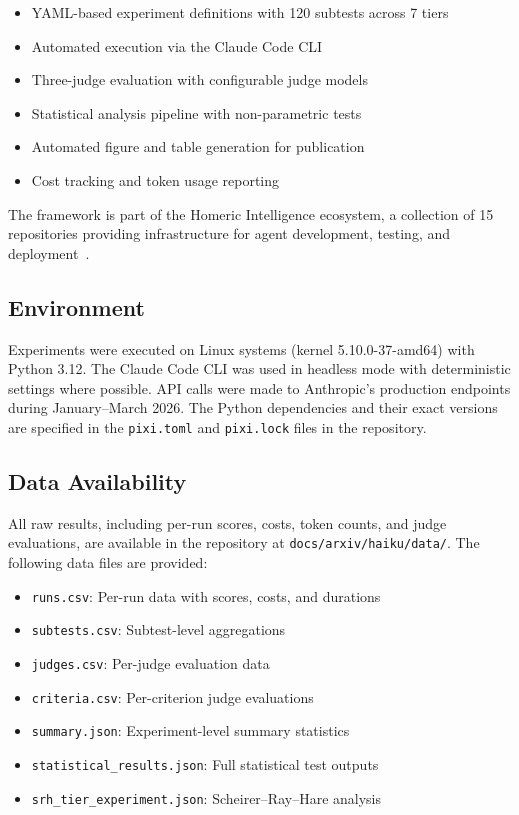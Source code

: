 \documentclass[11pt]{article}
\begin{document}
\begin{itemize}
  \item YAML-based experiment definitions with 120 subtests across 7 tiers
  \item Automated execution via the Claude Code CLI~\cite{anthropic2024claude}
  \item Three-judge evaluation with configurable judge models
  \item Statistical analysis pipeline with non-parametric tests
  \item Automated figure and table generation for publication
  \item Cost tracking and token usage reporting
\end{itemize}

The framework is part of the Homeric Intelligence ecosystem, a collection of
15 repositories providing infrastructure for agent development, testing, and
deployment~\cite{projectodyssey}.

\subsection{Environment}

Experiments were executed on Linux systems (kernel 5.10.0-37-amd64) with
Python 3.12. The Claude Code CLI was used in headless mode with deterministic
settings where possible. API calls were made to Anthropic's production
endpoints during January--March 2026. The Python dependencies and their
exact versions are specified in the \texttt{pixi.toml} and
\texttt{pixi.lock} files in the repository.

\subsection{Data Availability}

All raw results, including per-run scores, costs, token counts, and judge
evaluations, are available in the repository at
\texttt{docs/arxiv/haiku/data/}. The following data files are provided:

\begin{itemize}
  \item \texttt{runs.csv}: Per-run data with scores, costs, and durations
  \item \texttt{subtests.csv}: Subtest-level aggregations
  \item \texttt{judges.csv}: Per-judge evaluation data
  \item \texttt{criteria.csv}: Per-criterion judge evaluations
  \item \texttt{summary.json}: Experiment-level summary statistics
  \item \texttt{statistical\_results.json}: Full statistical test outputs
  \item \texttt{srh\_tier\_experiment.json}: Scheirer--Ray--Hare analysis
\end{itemize}
\end{document}
